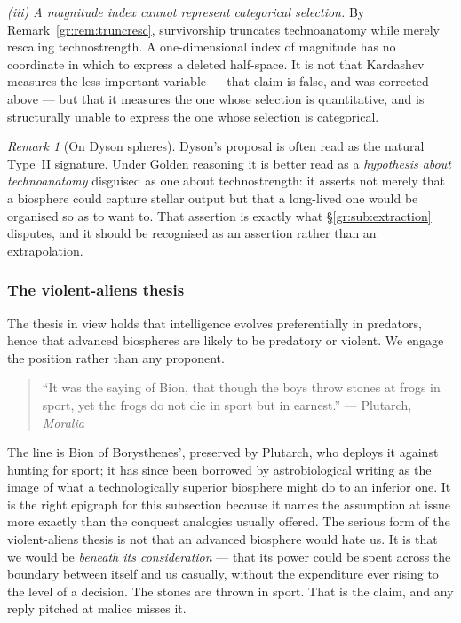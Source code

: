 \documentclass[11pt]{article}
\numberwithin{equation}{section}
\theoremstyle{plain}
\theoremstyle{definition}
\theoremstyle{remark}
\newtheorem{remark}[theorem]{Remark}
\begin{document}
\emph{(iii) A magnitude index cannot represent categorical selection.}
By Remark~\ref{gr:rem:truncresc}, survivorship truncates technoanatomy
while merely rescaling technostrength. A one-dimensional index of
magnitude has no coordinate in which to express a deleted half-space. It
is not that Kardashev measures the less important variable --- that
claim is false, and was corrected above --- but that it measures the one
whose selection is quantitative, and is structurally unable to express
the one whose selection is categorical.

\begin{remark}[On Dyson spheres]\label{gr:rem:dyson}
Dyson's proposal \cite{Dys60} is often read as the natural
Type~II signature. Under Golden reasoning it is better read as a
\emph{hypothesis about technoanatomy} disguised as one about
technostrength: it asserts not merely that a biosphere could capture
stellar output but that a long-lived one would be organised so as to
want to. That assertion is exactly what \S\ref{gr:sub:extraction}
disputes, and it should be recognised as an assertion rather than an
extrapolation.
\end{remark}

\subsubsection{The violent-aliens thesis}\label{gr:subsub:violence}

The thesis in view holds that intelligence evolves preferentially in
predators, hence that advanced biospheres are likely to be predatory or
violent. We engage the position rather than any proponent.

\begin{quote}\small
``It was the saying of Bion, that though the boys throw stones at frogs
in sport, yet the frogs do not die in sport but in earnest.''
\hfill --- Plutarch, \emph{Moralia} \cite{Plutarch}
\end{quote}

\noindent The line is Bion of Borysthenes', preserved by Plutarch, who
deploys it against hunting for sport; it has since been borrowed by
astrobiological writing as the image of what a technologically superior
biosphere might do to an inferior one. It is the right epigraph for this
subsection because it names the assumption at issue more exactly than
the conquest analogies usually offered. The serious form of the
violent-aliens thesis is not that an advanced biosphere would hate us.
It is that we would be \emph{beneath its consideration} --- that its
power could be spent across the boundary between itself and us
casually, without the expenditure ever rising to the level of a
decision. The stones are thrown in sport. That is the claim, and any
reply pitched at malice misses it.
\end{document}
